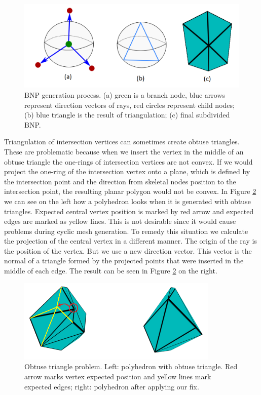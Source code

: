 \begin{figure}[h]
    \centering
    \includegraphics[width=\textwidth]{images/bnp_gen_ilu.png}
    \caption[BNP generation process]{BNP generation process. (a) green is a branch node, blue arrows represent direction vectors of rays, red circles represent child nodes; (b) blue triangle is the result of triangulation; (c) final subdivided BNP.}
    \label{fig:bnp_gen_ilu}
\end{figure}

Triangulation of intersection vertices can sometimes create obtuse triangles. These are problematic because when we insert the vertex in the middle of an obtuse triangle the one-rings of intersection vertices are not convex. If we would project the one-ring of the intersection vertex onto a plane, which is defined by the intersection point and the direction from skeletal nodes position to the intersection point, the resulting planar polygon would not be convex. In Figure \ref{fig:obtus_tri_ilu} we can see on the left how a polyhedron looks when it is generated with obtuse triangles. Expected central vertex position is marked by red arrow and expected edges are marked as yellow lines. This is not desirable since it would cause problems during cyclic mesh generation. To remedy this situation we calculate the projection of the central vertex in a different manner. The origin of the ray is the position of the vertex. But we use a new direction vector. This vector is the normal of a triangle formed by the projected points that were inserted in the middle of each edge. The result can be seen in Figure \ref{fig:obtus_tri_ilu} on the right.

\begin{figure}[h]
    \centering
    \includegraphics[height=4cm]{images/obtuse_triangle_fix_ilu.png}
    \caption[Obtuse triangle problem]{Obtuse triangle problem. Left: polyhedron with obtuse triangle. Red arrow marks vertex expected position and yellow lines mark expected edges; right: polyhedron after applying our fix.}
    \label{fig:obtus_tri_ilu}
\end{figure}

